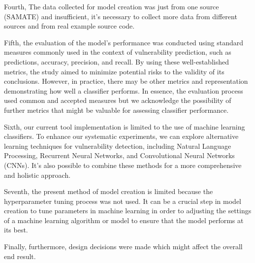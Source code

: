 Fourth, The data collected for model creation was just from one source (SAMATE) and  insufficient, it's necessary to collect more data from different sources and from real example source code.

Fifth, the evaluation of the model's performance was conducted using standard measures commonly used in the context of vulnerability prediction, such as predictions, accuracy, precision, and recall. By using these well-established metrics, the study aimed to minimize potential risks to the validity of its conclusions. However, in practice, there may be other metrics and representation demonstrating how well a classifier performs. In essence, the evaluation process used common and accepted measures but we acknowledge the possibility of further metrics that might be valuable for assessing classifier performance.

Sixth, our current tool implementation is limited to the use of machine learning classifiers. To enhance our systematic experiments, we can explore alternative learning techniques for vulnerability detection, including Natural Language Processing, Recurrent Neural Networks, and Convolutional Neural Networks (CNNs). It's also possible to combine these methods for a more comprehensive and holistic approach.

Seventh, the present  method of model creation is limited because the hyperparameter tuning process was not used. It can be a crucial step in model creation to tune parameters in machine learning in order to adjusting the settings of a machine learning algorithm or model to ensure that the model performs at its best.

Finally, furthermore, design decisions were made which might affect the overall end result.




